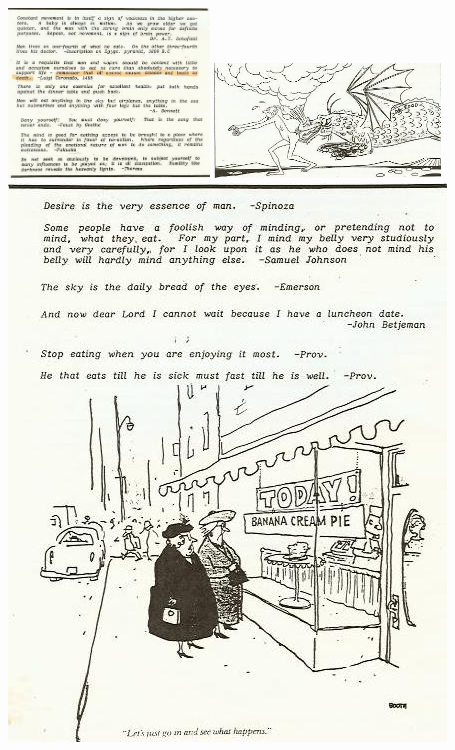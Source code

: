 \documentclass[landscape,twocolumn,letterpaper]{article}
\begin{document}
\clearpage%
\includegraphics[width=0.4\textwidth,bb= 0 0 439 370]{./p8.jpg}
\clearpage%
\includegraphics[width=0.45\textwidth,bb=0 0 447 227]{./p12.jpg}
\clearpage%
\includegraphics[height=0.8\textheight,bb=0 0 439 559]{./p14.jpg}
\clearpage%
\end{document}
